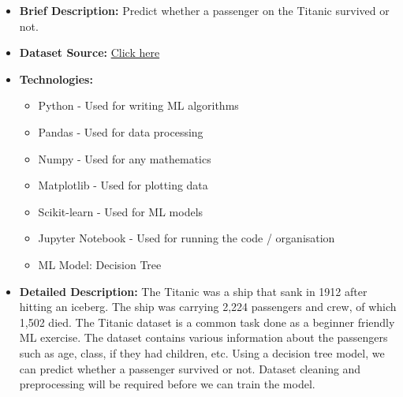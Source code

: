 \documentclass{article}
\begin{document}
\begin{itemize}
    \item \textbf{Brief Description:} Predict whether a passenger on the Titanic survived or not.
    \item \textbf{Dataset Source:} \href{https://web.stanford.edu/class/archive/cs/cs109/cs109.1166/problem12.html}{Click here}
    \item \textbf{Technologies:}
    \begin{itemize}
        \item Python - Used for writing ML algorithms
        \item Pandas - Used for data processing
        \item Numpy - Used for any mathematics
        \item Matplotlib - Used for plotting data
        \item Scikit-learn - Used for ML models
        \item Jupyter Notebook - Used for running the code / organisation
        \item ML Model: Decision Tree
    \end{itemize}
    \item \textbf{Detailed Description:} The Titanic was a ship that sank in 1912 after hitting an iceberg. The ship was carrying 2,224 passengers and crew, of which 1,502 died. 
    The Titanic dataset is a common task done as a beginner friendly ML exercise. The dataset contains various information about the passengers such as age, class, if they had children, etc.
    Using a decision tree model, we can predict whether a passenger survived or not. Dataset cleaning and preprocessing will be required before we can train the model.
\end{itemize}
\end{document}
